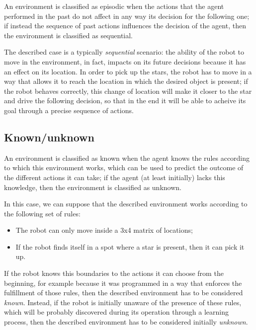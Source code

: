 \documentclass[letterpaper,headings=standardclasses]{scrartcl}
\begin{document}
An environment is classified as episodic when the actions that the agent performed in the past do not affect in any way its decision for the following one; if instead the sequence of past actions influences the decision of the agent, then the environment is classified as sequential.

The described case is a typically \emph{sequential} scenario: the ability of the robot to move in the environment, in fact, impacts on its future decisions because it has an effect on its location. In order to pick up the stars, the robot has to move in a way that allows it to reach the location in which the desired object is present; if the robot behaves correctly, this change of location will make it closer to the star and drive the following decision, so that in the end it will be able to acheive its goal through a precise sequence of actions.

\subsection{Known/unknown}

An environment is classified as known when the agent knows the rules according to which this environment works, which can be used to predict the outcome of the different actions it can take; if the agent (at least initially) lacks this knowledge, then the environment is classified as unknown.

In this case, we can suppose that the described environment works according to the following set of rules:

\begin{itemize}

\item The robot can only move inside a 3x4 matrix of locations;
\item If the robot finds itself in a spot where a star is present, then it can pick it up.

\end{itemize}

If the robot knows this boundaries to the actions it can choose from the beginning, for example because it was programmed in a way that enforces the fulfillment of those rules, then the described environment has to be considered \emph{known}. Instead, if the robot is initially unaware of the presence of these rules, which will be probably discovered during its operation through a learning process, then the described environment has to be considered initially \emph{unknown}.
\end{document}
